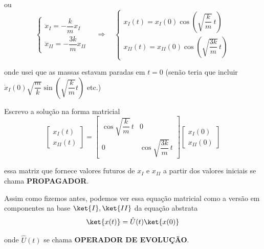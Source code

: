 ou
\begin{equation}
    \begin{cases}
        \ddot{x}_I = -\dfrac{k}{m} x_I \\[4pt]
        \ddot{x}_{II} = -\dfrac{3k}{m} x_{II}
    \end{cases}
    \quad \Longrightarrow \quad
    \begin{cases}
        x_I(t) = x_I(0) \cos\left( \sqrt{\dfrac{k}{m}}\, t \right) \\[4pt]
        x_{II}(t) = x_{II}(0) \cos\left( \sqrt{\dfrac{3k}{m}}\, t \right)
    \end{cases}
    \label{eq:aula5_solucao_normal}
\end{equation}

onde usei que as massas estavam paradas em $t=0$ (senão teria que incluir $\dot{x}_I(0)\sqrt{\dfrac{m}{k}}\sin\left(\sqrt{\dfrac{k}{m}}t\right)$ etc.)

\begin{center}
\end{center}

Escrevo a solução na forma matricial
\begin{equation}
    \begin{bmatrix} x_I(t) \\ x_{II}(t) \end{bmatrix}
    =
    \begin{bmatrix} \cos\sqrt{\dfrac{k}{m}}\, t & 0 \\[6pt] 0 & \cos\sqrt{\dfrac{3k}{m}}\, t \end{bmatrix}
    \begin{bmatrix} x_I(0) \\ x_{II}(0) \end{bmatrix}
\end{equation}

essa matriz que fornece valores futuros de $x_I$ e $x_{II}$ a partir dos valores iniciais se chama \textbf{PROPAGADOR}.

Assim como fizemos antes, podemos ver essa equação matricial como a versão em componentes na base $\ket{I}, \ket{II}$ da equação abstrata
\begin{equation}
    \ket{x(t)} = \hat{U}(t) \ket{x(0)}
\end{equation}

onde $\hat{U}(t)$ se chama \textbf{OPERADOR DE EVOLUÇÃO}.

